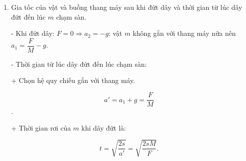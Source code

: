 \begin{dang}
{\begin{enumerate}[label=\alph*]
			- Các ngoại lực tác dụng lên hệ "thang máy và người" là: lực $\vec F$, các trọng lực $\vec P$, $\vec p$. Theo định luật II Niu - tơn:
			
			$$\vec F + \vec P + \vec  p = (M+m)\vec a.$$
			
			$$ a =\dfrac{F - (M+m)g}{M+m}.$$
			
			- Xét riêng vật $m$
			
			$$T - p =ma \Rightarrow T = m(g+a) \Rightarrow T = \dfrac{mF}{M+m}.$$
			
			\item Gia tốc của vật và buồng thang máy sau khi đứt dây và thời gian từ lúc dây đứt đến lúc $m$ chạm sàn.
			
			- Khi đứt dây: $F =0 \Rightarrow a_2 =-g$: vật $m$ không gắn với thang máy nữa nên $a_1 = \dfrac{F}{M} - g.$
			
			- Thời gian từ lúc dây đứt đến lúc chạm sàn:
			
			+ Chọn hệ quy chiếu gắn với thang máy. 
			
			$$a' =a_1 +g = \dfrac{F}{M}$$.
			
			+ Thời gian rơi của $m$ khi dây đứt là:
			
			$$ t=\sqrt {\dfrac{2s}{a'}} = \sqrt{\dfrac{2sM}{F}}.$$
			
			
		\end{enumerate}	
	}
	
\end{dang}
